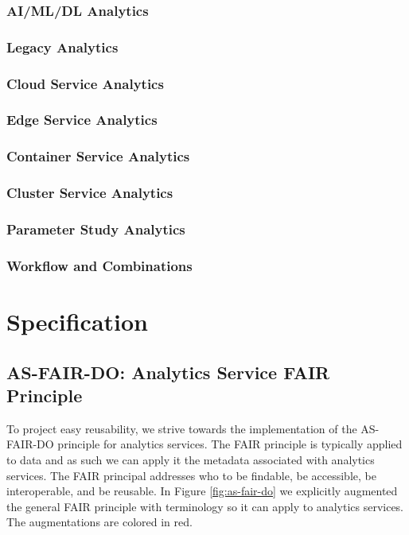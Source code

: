 \documentclass[12pt]{article}
\begin{document}
\subsubsection{AI/ML/DL  Analytics} 
\subsubsection{Legacy Analytics}
\subsubsection{Cloud Service Analytics}

\subsubsection{Edge Service Analytics}
\subsubsection{Container Service Analytics}
\subsubsection{Cluster Service Analytics}
\subsubsection{Parameter Study Analytics}
\subsubsection{Workflow and Combinations}






\section{Specification}


\subsection{AS-FAIR-DO: Analytics Service FAIR Principle}

To project easy reusability, we strive towards the implementation of the AS-FAIR-DO principle for analytics services. The FAIR principle is typically applied to data and as such we can apply it the metadata associated with analytics services. The FAIR principal addresses who to be findable, be accessible, be interoperable, and be reusable. In Figure \ref{fig:as-fair-do} we explicitly augmented the general FAIR principle with terminology so it can apply to analytics services. The augmentations are colored in red.
\end{document}
